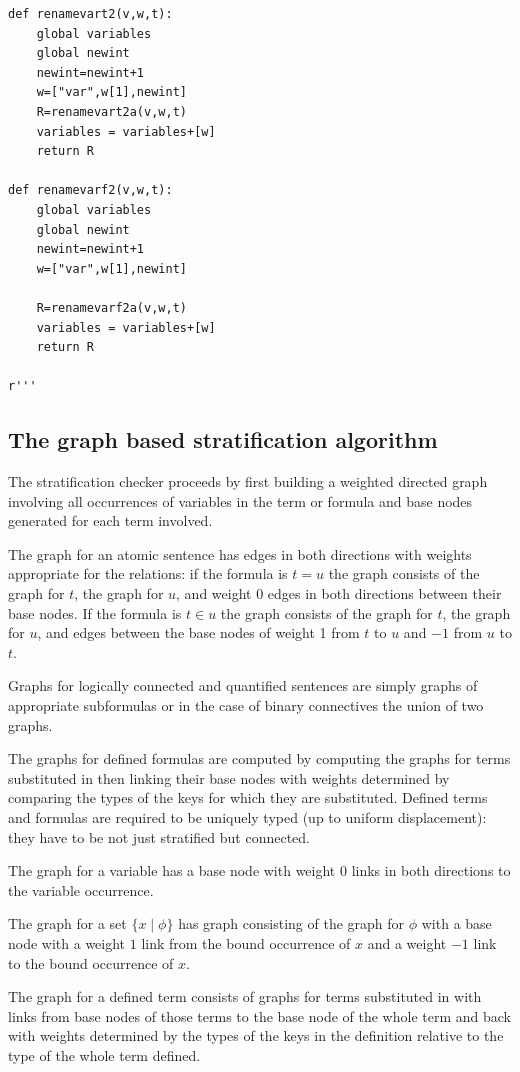 \documentclass{article}
\begin{document}
\begin{verbatim}
def renamevart2(v,w,t):
    global variables
    global newint
    newint=newint+1
    w=["var",w[1],newint]
    R=renamevart2a(v,w,t)
    variables = variables+[w]
    return R

def renamevarf2(v,w,t):
    global variables
    global newint
    newint=newint+1
    w=["var",w[1],newint]

    R=renamevarf2a(v,w,t)
    variables = variables+[w]
    return R

r'''

\end{verbatim}

\subsection{The graph based stratification algorithm}

The stratification checker proceeds by first building a weighted directed graph involving all occurrences of variables
in the term or formula and base nodes generated for each term involved.

The graph for an atomic sentence has edges in both directions with weights appropriate for the relations:
if the formula is $t=u$ the graph consists of the graph for $t$, the graph for $u$, and weight 0 edges in both directions
between their base nodes.  If the formula is $t \in u$ the graph consists of the graph for $t$, the graph for $u$,
and edges between the base nodes of weight 1 from $t$ to $u$ and $-1$ from $u$ to $t$.

Graphs for logically connected and quantified sentences are simply graphs of appropriate subformulas
or in the case of binary connectives the union of two graphs.

The graphs for defined formulas are computed by computing the graphs for terms substituted in then linking
their base nodes with weights determined by comparing the types of the keys for which they are substituted.
Defined terms and formulas are required to be uniquely typed (up to uniform displacement):  they have to be not just stratified but connected.

The graph for a variable has a base node with weight 0 links in both directions to the variable occurrence.

The graph for a set $\{x\mid \phi\}$ has graph consisting of the graph for $\phi$ with a base node with a weight $1$ link from the bound occurrence of $x$ and a weight $-1$ link to the bound occurrence of $x$.

The graph for a defined term consists of graphs for terms substituted in with links from base nodes of those terms
to the base node of the whole term and back with weights determined by the types of the keys in the definition relative to the type of the whole term defined.
\end{document}
